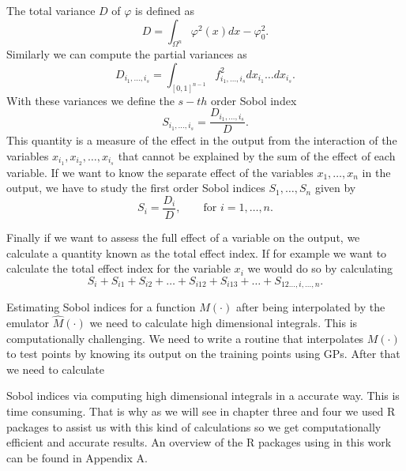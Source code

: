 \documentclass[12pt]{book}
\begin{document}
The total variance $D$ of $\varphi$ is defined as
\begin{equation*}
D=\int_{\Omega^{n}}\varphi^{2}(x)dx-\varphi_{0}^{2}.
\end{equation*}
Similarly we can compute the partial variances as
\begin{equation*}
D_{i_{1},\ldots,i_{s}}=\int_{[0,1]^{n-1}}f^{2}_{i_{1},\ldots,i_{s}}dx_{i_{1}}\ldots dx_{i_{s}}.
\end{equation*}
With these variances we define the $s-th$ order  Sobol index  
\begin{equation*} 
S_{i_{1},\ldots,i_{s}}=\frac{D_{i_{1},\ldots,i_{s}}}{D}.
\end{equation*}
This quantity is a measure of the effect in the output from the interaction of the 
variables $x_{i_{1}},x_{i_{2}},\ldots,x_{i_{s}}$ that cannot be explained by 
the sum of the effect of each variable. If 
we want to know the separate effect  of the variables 
$x_{1},\ldots,x_{n}$ in the output, we have to study
the first order Sobol indices $S_{1},\ldots,S_{n}$ given by
\begin{equation*}
S_{i}=\frac{D_{i}}{D},\qquad\text{for }i=1,\ldots,n.
\end{equation*}

Finally if we want to assess the full effect of a  variable  on the output, we calculate a quantity known 
as the total effect index. If for example we want to calculate the total effect index
for the variable $x_{i}$ we would do so by calculating
\begin{equation*}
S_{i}+S_{i1}+S_{i2}+\ldots+S_{i12}+S_{i13}+\ldots+S_{12\ldots,i,\ldots, n}.
\end{equation*}


Estimating Sobol indices for a function $M(\cdot)$ after being interpolated by the emulator $\hat{M}(\cdot)$
we need to calculate high dimensional integrals. This is computationally challenging.
We need to  write a routine that
interpolates $M(\cdot)$ to test points by knowing its output on the training points  
using GPs. After that we need to   calculate 

Sobol indices via computing high dimensional integrals in a accurate way.  
This is  time consuming.
That is why as  we will see
in chapter three and  four we used R packages to assist us with this kind of calculations so
we get computationally efficient and accurate results. An overview of the R packages using 
in this work can be found in Appendix A. 


\newpage
\end{document}
